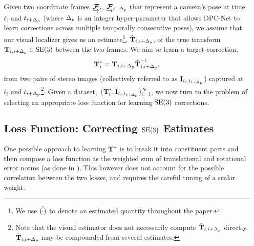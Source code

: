 Given two coordinate frames $\underrightarrow{ \boldsymbol{\mathbf{\mathcal{F}}} }_{i}$, $\underrightarrow{ \boldsymbol{\mathbf{\mathcal{F}}} }_{i+\Delta_p}$ that represent a camera's pose at time $t_{i}$ and $t_{i+\Delta_p}$ (where $\Delta_p$ is an integer hyper-parameter that allows DPC-Net to learn corrections across multiple temporally consecutive poses), we assume that our visual localizer gives us an estimate\footnote{We use $\hat{(\cdot)}$ to denote an estimated quantity throughout the paper.}, $\hat{\boldsymbol{\mathbf{T}}}_{i,i+\Delta_p}$, of the true transform $\boldsymbol{\mathbf{T}}_{i,i+\Delta_p} \in \mathrm{SE}(3)$ between the two frames. We aim to learn a target correction,
\begin{equation}
	\boldsymbol{\mathbf{T}}^*_i = \boldsymbol{\mathbf{T}}_{i,i+\Delta_p} {\hat{\boldsymbol{\mathbf{T}}}_{i,i+\Delta_p}}^{-1},
\end{equation}
from two pairs of stereo images (collectively referred to as $\boldsymbol{\mathbf{I}}_{t_{i}, t_{i+\Delta_p}}$) captured at $t_{i}$ and $t_{i+\Delta_p}$\footnote{Note that the visual estimator does not necessarily compute $\hat{\boldsymbol{\mathbf{T}}}_{i,i+\Delta_p}$ directly. $\hat{\boldsymbol{\mathbf{T}}}_{i,i+\Delta_p}$ may be compounded from several estimates.}. Given a dataset, $\{ \boldsymbol{\mathbf{T}}^*_i, \boldsymbol{\mathbf{I}}_{t_{i}, t_{i+\Delta_p}} \}^N_{i=1}$,  we now turn to the problem of selecting an appropriate loss function for learning $\mathrm{SE}(3)$ corrections.

\subsection{Loss Function: Correcting $\mathrm{SE}(3)$ Estimates}

One possible approach to learning $\boldsymbol{\mathbf{T}}^*$ is to break it into constituent parts and then compose a loss function as the weighted sum of translational and rotational error norms (as done in \cite{Kendall2017-u, Melekhov2017-dl, Oliveira2017-lt}). This however does not account for the possible correlation between the two losses, and requires the careful tuning of a scalar weight.

